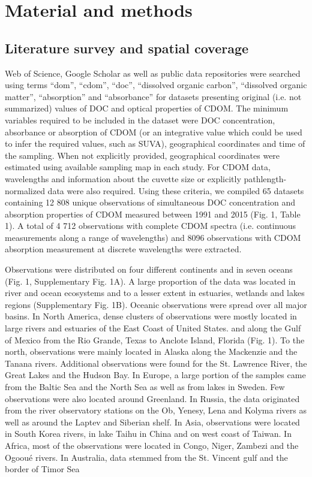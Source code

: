 
\section*{Material and methods}
\label{sec:Material and methods}

\subsection*{Literature survey and spatial coverage}

Web of Science, Google Scholar as well as public data repositories were searched using terms ``dom'', ``cdom'', ``doc'', ``dissolved organic carbon'', ``dissolved organic matter'',  ``absorption'' and ``absorbance'' for datasets presenting original (i.e. not summarized) values of DOC and optical properties of CDOM. The minimum variables required to be included in the dataset were DOC concentration, absorbance or absorption of CDOM (or an integrative value which could be used to infer the required values, such as SUVA), geographical coordinates and time of the sampling. When not explicitly provided, geographical coordinates were estimated using available sampling map in each study. For CDOM data, wavelengths and information about the cuvette size or explicitly pathlength-normalized data were also required. Using these criteria, we compiled 65 datasets containing 12 808 unique observations of simultaneous DOC concentration and absorption properties of CDOM measured between 1991 and 2015 (Fig. 1, Table 1). A total of 4 712 observations with complete CDOM spectra (i.e. continuous measurements along a range of wavelengths) and 8096 observations with CDOM absorption measurement at discrete wavelengths were extracted.

Observations were distributed on four different continents and in seven oceans (Fig. 1, Supplementary Fig. 1A). A large proportion of the data was located in river and ocean ecosystems and to a lesser extent in estuaries, wetlands and lakes regions (Supplementary Fig. 1B). Oceanic observations were spread over all major basins. In North America, dense clusters of observations were mostly located in large rivers and estuaries of the East Coast of United States. and along the Gulf of Mexico from the Rio Grande, Texas to Anclote Island, Florida (Fig. 1). To the north, observations were mainly located in Alaska along the Mackenzie and the Tanana rivers. Additional observations were found for the St. Lawrence River, the Great Lakes and the Hudson Bay. In Europe, a large portion of the samples came from the Baltic Sea and the North Sea as well as from lakes in Sweden. Few observations were also located around Greenland. In Russia, the data originated from the river observatory stations on the Ob, Yenesy, Lena and Kolyma rivers as well as around the Laptev and Siberian shelf. In Asia, observations were located in South Korea rivers, in lake Taihu in China and on west coast of Taiwan. In Africa, most of the observations were located in Congo, Niger, Zambezi and the Ogooué rivers. In Australia, data stemmed from the St. Vincent gulf and the border of Timor Sea


